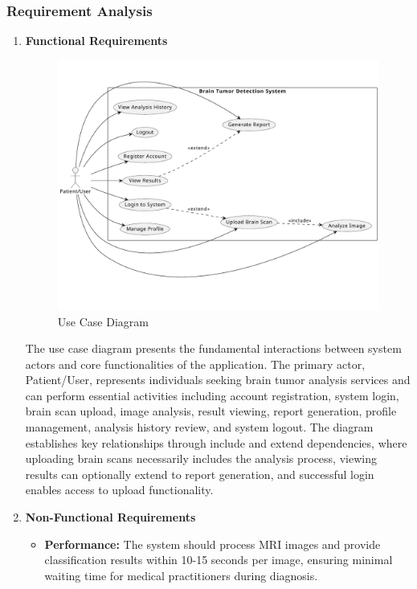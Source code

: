 \subsubsection{Requirement Analysis}
\begin{enumerate}[label=\roman*.]
    \item \textbf{Functional Requirements}
          \begin{center}
              \begin{figure}[H]
                  \centering
                  \includegraphics[width=0.85\linewidth]{Images/usecase.pdf}
                  \caption{Use Case Diagram}
                  \label{fig:UseCaseDiagram}
              \end{figure}
          \end{center}
          The use case diagram presents the fundamental interactions between system actors and core functionalities of the application. The primary actor, Patient/User, represents individuals seeking brain tumor analysis services and can perform essential activities including account registration, system login, brain scan upload, image analysis, result viewing, report generation, profile management, analysis history review, and system logout. The diagram establishes key relationships through include and extend dependencies, where uploading brain scans necessarily includes the analysis process, viewing results can optionally extend to report generation, and successful login enables access to upload functionality.

    \item \textbf{Non-Functional Requirements}
          \begin{itemize}
              \item \textbf{Performance:} The system should process MRI images and provide classification results within 10-15 seconds per image, ensuring minimal waiting time for medical practitioners during diagnosis.


\end{itemize}
\end{enumerate}
